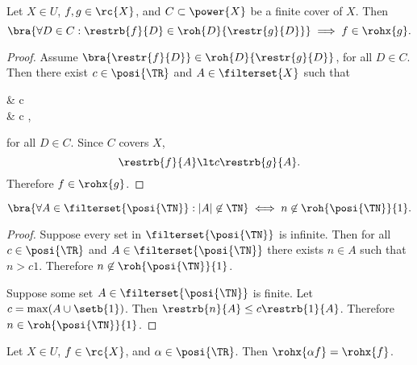 \documentclass[b5paper, english, oneside]{memoir}
\begin{document}
\begin{theorem}
\label{LocalLocality}
Let $X \in U$, $f, g \in \rc{X}$, and $C \subset \power{X}$ be a finite cover of $X$. Then 
\begin{equation}
\bra{\forall D \in C: \restrb{f}{D} \in \roh{D}{\restr{g}{D}}} \implies f \in \rohx{g}.
\end{equation}
\end{theorem}

\begin{proof}


Assume $\bra{\restr{f}{D}} \in \roh{D}{\restr{g}{D}}$, for all $D \in C$. Then there exist $c \in \posi{\TR}$ and $A \in \filterset{X}$ such that
\begin{eqs}
\qquad &  \lt c  \\
\iffr &  \lt c ,
\end{eqs}
for all $D \in C$. Since $C$ covers $X$,
\begin{equation}
\restrb{f}{A} \lt c \restrb{g}{A}.
\end{equation}
Therefore $f \in \rohx{g}$.
\end{proof}

\begin{theorem}
\label{LocalOneSeparationCharacterized}
\begin{equation}
\bra{\forall A \in \filterset{\posi{\TN}} : |A| \not\in \TN} \iff n \not\in \roh{\posi{\TN}}{1}.
\end{equation}
\end{theorem}

\begin{proof}
\proofpart{$\implies$}
Suppose every set in $\filterset{\posi{\TN}}$ is infinite. Then for all $c \in \posi{\TR}$ and $A \in \filterset{\posi{\TN}}$ there exists $n \in A$ such that $n > c 1$. Therefore $n \not\in \roh{\posi{\TN}}{1}$.

\proofpart{$\impliedby$}
Suppose some set $A \in \filterset{\posi{\TN}}$ is finite. Let $c = \max(A \cup \setb{1})$. Then $\restrb{n}{A} \leq c \restrb{1}{A}$. Therefore $n \in \roh{\posi{\TN}}{1}$.
\end{proof}

\begin{theorem}
\label{LocalScaleInvariance}
Let $X \in U$, $f \in \rc{X}$, and $\alpha \in \posi{\TR}$. Then $\rohx{\alpha f} = \rohx{f}$. 
\end{theorem}
\end{document}
